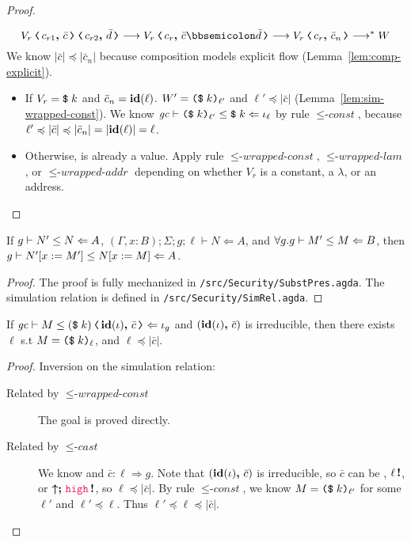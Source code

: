 \begin{proof}
\begin{description}
\begin{description}
\[
\cccast{\cccast{V_r}{\coerc{c_{r1}}{\bar{c}}}}{\coerc{c_{r2}}{\bar{d}}} \longrightarrow \cccast{V_r}{\coerc{c_r}{\bar{c} \mdoubleplus \bar{d}}}
\longrightarrow \cccast{V_r}{\coerc{c_r}{\bar{c}_n}} \longrightarrow^{*} W
\]
We know $|\bar{c}| \preccurlyeq |\bar{c}_n|$ because composition models explicit flow (Lemma~\ref{lem:comp-explicit}).
\begin{itemize}
\item If $V_r = \text{\texttt{{\$}}}\;{k}$ and $\bar{c}_n = \mathit{\mathbf{id}}(\ell)$. $W' = \text{\texttt{{(\$}}}\;{k}\text{\texttt{{)}}}_{\ell'}$
and $\ell' \preccurlyeq |\bar{c}|$ (Lemma~\ref{lem:sim-wrapped-const}).
We know ${\mathit{gc}}\vdash{\ensuremath{\text{\texttt{{(\$}}}\;{k}\text{\texttt{{)}}}_{\ell'}}}\leq{\ensuremath{\text{\texttt{{\$}}}\;{k}}}\Leftarrow{\iota_\ell}$ by rule ${\leq}\textit{-const}$,
because $\ell' \preccurlyeq |\bar{c}| \preccurlyeq |\bar{c}_n| = |\mathit{\mathbf{id}}(\ell)| = \ell$.
\item Otherwise,  is already a value.
Apply rule ${\leq}\textit{-wrapped-const}$, ${\leq}\textit{-wrapped-lam}$, or ${\leq}\textit{-wrapped-addr}$
depending on whether $V_r$ is a constant, a $\lambda$, or an address.
\end{itemize}
\end{description}
\end{description}
\end{proof}

\begin{lemma}
  \label{lem:subst-sim}
  If ${g}\vdash{N'}\leq{N}\Leftarrow{A}$, $(\Gamma, x:B);\Sigma;g;\ell \vdash N \Leftarrow A$, and $\forall g. {g}\vdash{M'}\leq{M}\Leftarrow{B}$, then ${g}\vdash{N'[x:=M']}\leq{N[x:=M]}\Leftarrow{A}$.
\end{lemma}
\begin{proof}
  The proof is fully mechanized in \texttt{/src/Security/SubstPres.agda}. The
  simulation relation is defined in \texttt{/src/Security/SimRel.agda}.
\end{proof}

\begin{lemma}
\label{lem:sim-wrapped-const}
If $\simrel{\gc}{M}{\cccast{(\ccconst{k})}{\coerc{\id{\iota}}{\bar{c}}}}{\iota_g}$
and $({\mathit{\mathbf{id}}(\iota)}\boldsymbol{,}\,{\bar{c}})$ is irreducible,
then there exists $\ell$ s.t $M = \text{\texttt{{(\$}}}\;{k}\text{\texttt{{)}}}_{\ell}$, and $\ell \preccurlyeq |\bar{c}|$.
\end{lemma}
\begin{proof}
Inversion on the simulation relation:
\begin{description}
\item[Related by ${\leq}\textit{-wrapped-const}$] The goal is proved directly.
\item[Related by ${\leq}\textit{-cast}$] We know 
              and $\bar{c} : \ell \Rightarrow g$. Note that $({\mathit{\mathbf{id}}(\iota)}\boldsymbol{,}\,{\bar{c}})$ is irreducible,
              so $\bar{c}$ can be \up, ${\ell}\,\boldsymbol{!}$, or $\up\seq\inj{\high}$, so $\ell \preccurlyeq |\bar{c}|$.
              By rule ${\leq}\textit{-const}$, we know $M = \text{\texttt{{(\$}}}\;{k}\text{\texttt{{)}}}_{\ell'}$ for some $\ell'$
              and $\ell' \preccurlyeq \ell$.
              Thus $\ell' \preccurlyeq \ell \preccurlyeq |\bar{c}|$.
\end{description}
\end{proof}

